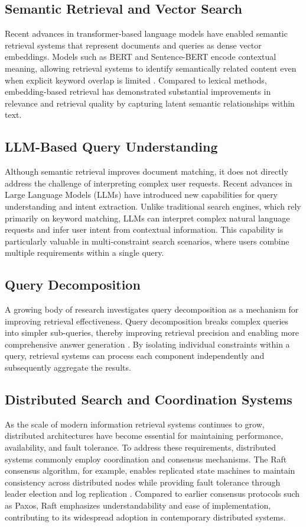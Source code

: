 \documentclass[conference]{IEEEtran}
\begin{document}
\subsection{Semantic Retrieval and Vector Search}
Recent advances in transformer-based language models have enabled semantic retrieval systems that represent documents and queries as dense vector embeddings. Models such as BERT and Sentence-BERT encode contextual meaning, allowing retrieval systems to identify semantically related content even when explicit keyword overlap is limited \cite{Reimers2019SentenceBERTSE}. Compared to lexical methods, embedding-based retrieval has demonstrated substantial improvements in relevance and retrieval quality by capturing latent semantic relationships within text.

\subsection{LLM-Based Query Understanding}
Although semantic retrieval improves document matching, it does not directly address the challenge of interpreting complex user requests. Recent advances in Large Language Models (LLMs) have introduced new capabilities for query understanding and intent extraction. Unlike traditional search engines, which rely primarily on keyword matching, LLMs can interpret complex natural language requests and infer user intent from contextual information. This capability is particularly valuable in multi-constraint search scenarios, where users combine multiple requirements within a single query.

\subsection{Query Decomposition}
A growing body of research investigates query decomposition as a mechanism for improving retrieval effectiveness. Query decomposition breaks complex queries into simpler sub-queries, thereby improving retrieval precision and enabling more comprehensive answer generation \cite{Dong2025LeveragingLQ}. By isolating individual constraints within a query, retrieval systems can process each component independently and subsequently aggregate the results. 


\subsection{Distributed Search and Coordination Systems}
As the scale of modern information retrieval systems continues to grow, distributed architectures have become essential for maintaining performance, availability, and fault tolerance. To address these requirements, distributed systems commonly employ coordination and consensus mechanisms. The Raft consensus algorithm, for example, enables replicated state machines to maintain consistency across distributed nodes while providing fault tolerance through leader election and log replication \cite{Ongaro2014InSO}. Compared to earlier consensus protocols such as Paxos, Raft emphasizes understandability and ease of implementation, contributing to its widespread adoption in contemporary distributed systems.
\end{document}
